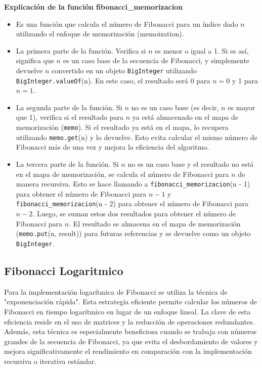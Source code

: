 \documentclass{article}
\begin{document}
            \textbf{Explicación de la función fibonacci\_memorizacion}
            \begin{itemize}
                \item Es una función que calcula el número de Fibonacci para un índice dado \(n\) utilizando el enfoque de memorización (memoization).
                \item La primera parte de la función. Verifica si \(n\) es menor o igual a 1. Si es así, significa que \(n\) es un caso base de la secuencia de Fibonacci, y simplemente devuelve \(n\) convertido en un objeto \texttt{BigInteger} utilizando \texttt{BigInteger.valueOf}(n). En este caso, el resultado será 0 para \(n=0\) y 1 para \(n=1\).
                \item La segunda parte de la función. Si \(n\) no es un caso base (es decir, \(n\) es mayor que 1), verifica si el resultado para \(n\) ya está almacenado en el mapa de memorización (\texttt{memo}). Si el resultado ya está en el mapa, lo recupera utilizando \texttt{memo.get}(n) y lo devuelve. Esto evita calcular el mismo número de Fibonacci más de una vez y mejora la eficiencia del algoritmo.
                \item La tercera parte de la función. Si \(n\) no es un caso base y el resultado no está en el mapa de memorización, se calcula el número de Fibonacci para \(n\) de manera recursiva. Esto se hace llamando a \texttt{fibonacci\_memorizacion}(n - 1) para obtener el número de Fibonacci para \(n - 1\) y \texttt{fibonacci\_memorizacion}(n - 2) para obtener el número de Fibonacci para \(n - 2\). Luego, se suman estos dos resultados para obtener el número de Fibonacci para \(n\). El resultado se almacena en el mapa de memorización (\texttt{memo.put}(n, result)) para futuras referencias y se devuelve como un objeto \texttt{BigInteger}.
            \end{itemize}
        
        \subsection{Fibonacci Logaritmico}
            Para la implementación logarítmica de Fibonacci se utiliza la técnica de "exponenciación rápida". Esta estrategia eficiente permite calcular los números de Fibonacci en tiempo logarítmico en lugar de un enfoque lineal. La clave de esta eficiencia reside en el uso de matrices y la reducción de operaciones redundantes. Además, esta técnica es especialmente beneficiosa cuando se trabaja con números grandes de la secuencia de Fibonacci, ya que evita el desbordamiento de valores y mejora significativamente el rendimiento en comparación con la implementación recursiva o iterativa estándar.
\end{document}
